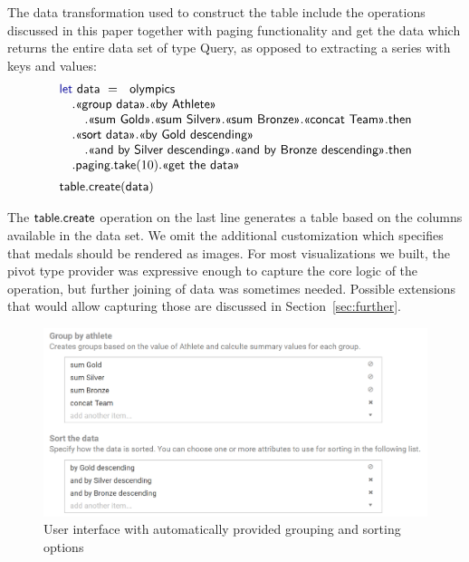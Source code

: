 \documentclass[a4paper,UKenglish]{lipics-v2016}
\theoremstyle{plain}
\theoremstyle{definition}
\newcommand{\kvd}[1]{\textnormal{\textcolor{kvdclr}{\sffamily #1}}}
\newcommand{\ident}[1]{\textnormal{\sffamily #1}}
\newcommand{\qident}[1]{\textnormal{\sffamily \guillemotleft #1\guillemotright}}
\begin{document}
The data transformation used to construct the table include the operations discussed in this paper
together with paging functionality and \qident{get the data} which returns the entire data set
of type \ident{Query}, as opposed to extracting a series with keys and values:
%
\begin{equation*}
\begin{array}{l}
\kvd{let}~\ident{data}~=~\ident{olympics}\\
\quad .\qident{group data}.\qident{by Athlete}\\
\qquad .\qident{sum Gold}.\qident{sum Silver}.\qident{sum Bronze}.\qident{concat Team}.\ident{then}\\
\quad .\qident{sort data}.\qident{by Gold descending}\\
\qquad .\qident{and by Silver descending}.\qident{and by Bronze descending}.\ident{then}\\
\quad .\ident{paging}.\ident{take}(10).\qident{get the data}\\[0.5em]
\ident{table.create}(\ident{data})
\end{array}
\end{equation*}

\noindent
The $\ident{table.create}$ operation on the last line generates a table based on the columns 
available in the data set. We omit the additional customization which specifies that medals should
be rendered as images. For most visualizations we built, the pivot type provider was expressive
enough to capture the core logic of the operation, but further joining of data was sometimes
needed. Possible extensions that would allow capturing those are discussed in 
Section~\ref{sec:further}.


\begin{figure}[t]
\begin{center}
\includegraphics[scale=0.32,trim=0mm 0mm 0mm 0mm,clip]{images/options.png} %
\end{center}
\caption{User interface with automatically provided grouping and sorting options}
\label{fig:case-opts}
\end{figure}
\end{document}
